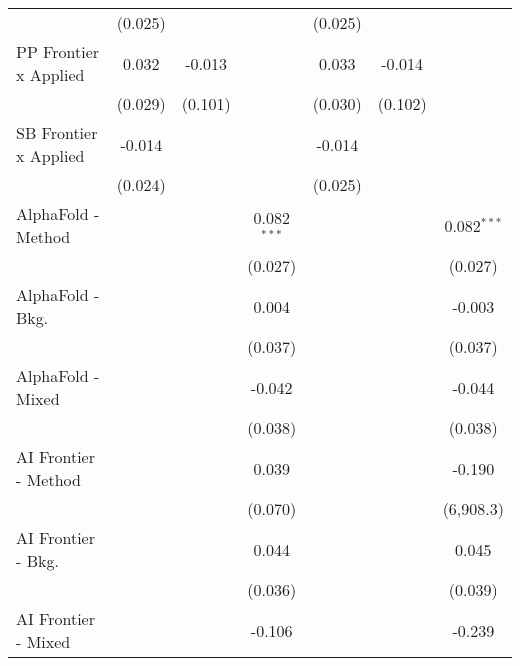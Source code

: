 \begin{tabular}{lcccccc}
                                  & (0.025)        &                &                & (0.025)        &                &   \\   
   PP Frontier x Applied          & 0.032          & -0.013         &                & 0.033          & -0.014         &   \\   
                                  & (0.029)        & (0.101)        &                & (0.030)        & (0.102)        &   \\   
   SB Frontier x Applied          & -0.014         &                &                & -0.014         &                &   \\   
                                  & (0.024)        &                &                & (0.025)        &                &   \\   
   AlphaFold - Method             &                &                & 0.082$^{***}$  &                &                & 0.082$^{***}$\\   
                                  &                &                & (0.027)        &                &                & (0.027)\\   
   AlphaFold - Bkg.               &                &                & 0.004          &                &                & -0.003\\   
                                  &                &                & (0.037)        &                &                & (0.037)\\   
   AlphaFold - Mixed              &                &                & -0.042         &                &                & -0.044\\   
                                  &                &                & (0.038)        &                &                & (0.038)\\   
   AI Frontier - Method           &                &                & 0.039          &                &                & -0.190\\   
                                  &                &                & (0.070)        &                &                & (6,908.3)\\   
   AI Frontier - Bkg.             &                &                & 0.044          &                &                & 0.045\\   
                                  &                &                & (0.036)        &                &                & (0.039)\\   
   AI Frontier - Mixed            &                &                & -0.106         &                &                & -0.239\\   

\end{tabular}
